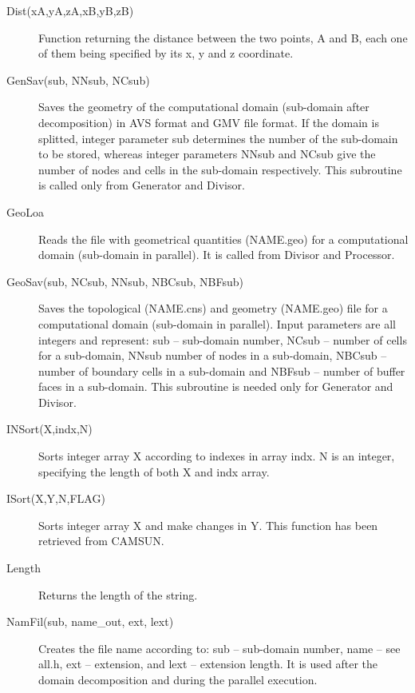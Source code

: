 \documentclass[10pt]{article}
\newcommand*{\tc}{\ttfamily} %
\newcommand*{\tn}{\sffamily} %
\begin{document}
    \begin{description}

    \item[\tc Dist(xA,yA,zA,xB,yB,zB)] Function returning the
      distance between the two points, A and B, each one of them
      being specified by its x, y and z coordinate.

    \item[\tc GenSav(sub, NNsub, NCsub)] Saves the geometry of 
      the computational domain (sub-domain after decomposition) in 
      AVS format and GMV file format. 
      If the domain is splitted, integer parameter {\tc sub}
      determines the number of the sub-domain to be stored, whereas
      integer parameters {\tc NNsub} and {\tc NCsub} give the number of 
      nodes and cells in the sub-domain respectively. This subroutine
      is called only from {\tn Generator} and {\tn Divisor}.

    \item[\tc GeoLoa] Reads the file with geometrical quantities
      ({\tc NAME.geo}) for a computational domain (sub-domain in parallel). 
      It is called from {\tn Divisor} and {\tn Processor}. 

    \item[\tc GeoSav(sub, NCsub, NNsub, NBCsub, NBFsub)] Saves 
      the topological ({\tc NAME.cns}) and geometry ({\tc NAME.geo})
      file for a computational domain (sub-domain in parallel). 
      Input parameters are all integers and represent: {\tc sub} -- sub-domain
      number, {\tc NCsub} -- number of cells for a sub-domain, {\tc NNsub} 
      number of nodes in a sub-domain, {\tc NBCsub} -- number of boundary 
      cells in a sub-domain and {\tc NBFsub} -- number of buffer faces
      in a sub-domain. This subroutine is needed only for {\tn Generator}
      and {\tn Divisor}.

    \item[\tc INSort(X,indx,N)] Sorts integer array {\tc X} according
      to indexes in array {\tc indx}. {\tc N} is an integer, specifying
      the length of both {\tc X} and {\tc indx} array.

    \item[\tc ISort(X,Y,N,FLAG)] Sorts integer array {\tc X} and 
      make changes in {\tc Y}.  This function has been retrieved
      from CAMSUN.

    \item[\tc Length] Returns the length of the string.

    \item[\tc NamFil(sub, name\_out, ext, lext)] Creates the file 
      name according to: {\tc sub} -- sub-domain number, 
      {\tc name} -- see {\tc all.h}, {\tc ext} -- extension,
      and {\tc lext} -- extension length. It is used after
      the domain decomposition and during the parallel execution.


\end{description}
\end{document}

